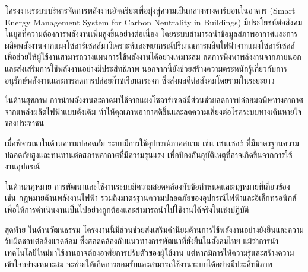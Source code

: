 \hspace{\parindent}โครงงานระบบบริหารจัดการพลังงานอัจฉริยะเพื่อมุ่งสู่ความเป็นกลางทางคาร์บอนในอาคาร (Smart Energy Management System for Carbon Neutrality in Buildings) มีประโยชน์ต่อสังคมในยุคที่ความต้องการพลังงานเพิ่มสูงขึ้นอย่างต่อเนื่อง โดยระบบสามารถนำข้อมูลสภาพอากาศและการผลิตพลังงานจากแผงโซลาร์เซลล์มาวิเคราะห์และพยากรณ์ปริมาณการผลิตไฟฟ้าจากแผงโซลาร์เซลล์ เพื่อช่วยให้ผู้ใช้งานสามารถวางแผนการใช้พลังงานได้อย่างเหมาะสม ลดการพึ่งพาพลังงานจากภายนอก และส่งเสริมการใช้พลังงานอย่างมีประสิทธิภาพ นอกจากนี้ยังช่วยสร้างความตระหนักรู้เกี่ยวกับการอนุรักษ์พลังงานและการลดการปล่อยก๊าซเรือนกระจก ซึ่งส่งผลดีต่อสังคมโดยรวมในระยะยาว

ในด้านสุขภาพ การนำพลังงานสะอาดมาใช้จากแผงโซลาร์เซลล์มีส่วนช่วยลดการปล่อยมลพิษทางอากาศจากแหล่งผลิตไฟฟ้าแบบดั้งเดิม ทำให้คุณภาพอากาศดีขึ้นและลดความเสี่ยงต่อโรคระบบทางเดินหายใจของประชาชน

เมื่อพิจารณาในด้านความปลอดภัย ระบบมีการใช้อุปกรณ์ภาคสนาม เช่น เซนเซอร์ ที่มีมาตรฐานความปลอดภัยสูงและทนทานต่อสภาพอากาศที่มีความรุนแรง เพื่อป้องกันอุบัติเหตุที่อาจเกิดขึ้นจากการใช้งานอุปกรณ์

ในด้านกฎหมาย การพัฒนาและใช้งานระบบมีความสอดคล้องกับข้อกำหนดและกฎหมายที่เกี่ยวข้อง เช่น กฎหมายด้านพลังงานไฟฟ้า รวมถึงมาตรฐานความปลอดภัยของอุปกรณ์ไฟฟ้าและอิเล็กทรอนิกส์ เพื่อให้การดำเนินงานเป็นไปอย่างถูกต้องและสามารถนำไปใช้งานได้จริงในเชิงปฏิบัติ

สุดท้าย ในด้านวัฒนธรรม โครงงานนี้มีส่วนช่วยส่งเสริมค่านิยมด้านการใช้พลังงานอย่างยั่งยืนและความรับผิดชอบต่อสิ่งแวดล้อม ซึ่งสอดคล้องกับแนวทางการพัฒนาที่ยั่งยืนในสังคมไทย แม้ว่าการนำเทคโนโลยีใหม่มาใช้งานอาจต้องอาศัยการปรับตัวของผู้ใช้งาน แต่หากมีการให้ความรู้และสร้างความเข้าใจอย่างเหมาะสม จะช่วยให้เกิดการยอมรับและสามารถใช้งานระบบได้อย่างมีประสิทธิภาพ
